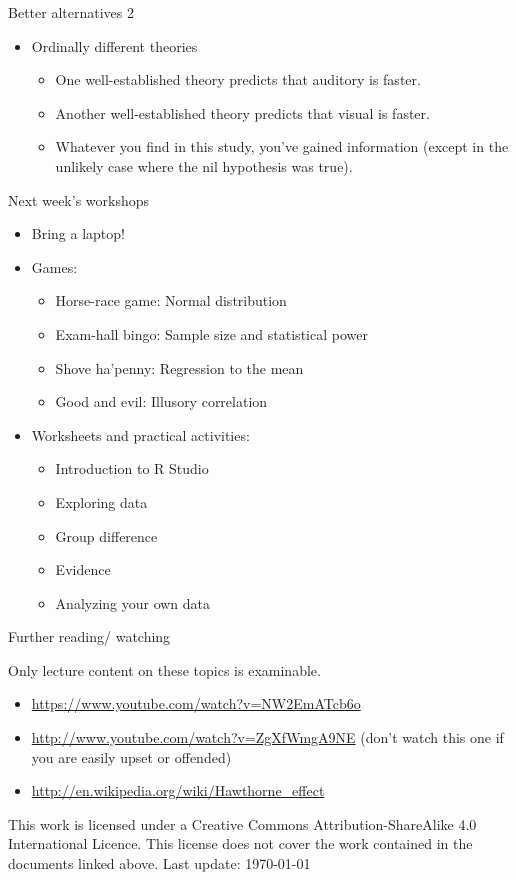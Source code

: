 \documentclass{beamer}
\begin{document}
\begin{frame}{Better alternatives 2}
\begin{itemize}
\item Ordinally different theories
\begin{itemize}
\item One well-established theory predicts that auditory is faster.
\item Another well-established theory predicts that visual is faster.
\item Whatever you find in this study, you've gained information (except in the unlikely case where the nil hypothesis was true).
\end{itemize}
\end{itemize}
\end{frame}

\begin{frame}{Next week's workshops}
  \begin{itemize}
    \item Bring a laptop!
    \item Games:
    \begin{itemize}
      \item Horse-race game: Normal distribution
      \item Exam-hall bingo: Sample size and statistical power
      \item Shove ha'penny: Regression to the mean
      \item Good and evil: Illusory correlation
      \end{itemize}
    \item Worksheets and practical activities:
      \begin{itemize}
      \item Introduction to R Studio
      \item Exploring data
      \item Group difference
      \item Evidence
      \item Analyzing your own data
      \end{itemize}
\end{itemize}
\end{frame}

\begin{frame}{Further reading/ watching}

Only lecture content on these topics is examinable.

\begin{itemize}
\item \url{https://www.youtube.com/watch?v=NW2EmATcb6o}
\item \url{http://www.youtube.com/watch?v=ZgXfWmgA9NE} (don't watch this one if you are easily upset or offended)	
\item  \url{http://en.wikipedia.org/wiki/Hawthorne_effect}
\end{itemize}

\tiny This work is licensed under a Creative Commons
Attribution-ShareAlike 4.0 International Licence. This license does
not cover the work contained in the documents linked above. Last
update: \today

\end{frame}
\end{document}
